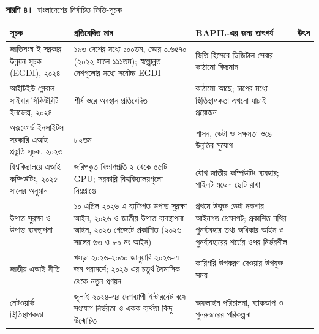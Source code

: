 \documentclass[border=10pt]{standalone}
\begin{document}
\begin{minipage}{17cm}
{\large\bfseries সারণি ৪।}\ {\large বাংলাদেশের নির্বাচিত ভিত্তি-সূচক}\par\vspace{7pt}
\small
{}
\begin{tabularx}{\linewidth}{@{}>{\hsize=1.045\hsize\raggedright\arraybackslash}X>{\hsize=1.545\hsize\raggedright\arraybackslash}X>{\hsize=1.000\hsize\raggedright\arraybackslash}X>{\hsize=0.409\hsize\raggedright\arraybackslash}X@{}}
\arrayrulecolor{bapilrule}\toprule
\rowcolor{white}\textbf{সূচক} & \textbf{প্রতিবেদিত মান} & \textbf{BAPIL-এর জন্য তাৎপর্য} & \textbf{উৎস} \\
\midrule
জাতিসংঘ ই-সরকার উন্নয়ন সূচক (EGDI), ২০২৪ & ১৯৩ দেশের মধ্যে ১০০তম, স্কোর ০.৬৫৭০ (২০২২ সালে ১১১তম); স্বল্পোন্নত দেশগুলোর মধ্যে সর্বোচ্চ EGDI & ভিত্তি হিসেবে ডিজিটাল সেবার কাঠামো বিদ্যমান & [5, 23] \\
আইটিইউ গ্লোবাল সাইবার সিকিউরিটি ইনডেক্স, ২০২৪ & শীর্ষ স্তরে অবস্থান প্রতিবেদিত & কাঠামো আছে; চাপের মধ্যে স্থিতিস্থাপকতা এখনো যাচাই প্রয়োজন & [24, 25] \\
অক্সফোর্ড ইনসাইটস সরকারি এআই প্রস্তুতি সূচক, ২০২৩ & ৮২তম & শাসন, ডেটা ও সক্ষমতা স্তম্ভে উন্নতির সুযোগ & [26, 27] \\
বিশ্ববিদ্যালয়ে এআই কম্পিউটিং, ২০২৫ সালের অনুমান & জরিপকৃত বিভাগপ্রতি ২ থেকে ৫৫টি GPU; সরকারি বিশ্ববিদ্যালয়গুলো নিম্নপ্রান্তে & যৌথ জাতীয় কম্পিউটিং ব্যবহার; পাইলট মডেল ছোট রাখা & [27] \\
উপাত্ত সুরক্ষা ও উপাত্ত ব্যবস্থাপনা & ১০ এপ্রিল ২০২৬-এ ব্যক্তিগত উপাত্ত সুরক্ষা আইন, ২০২৬ ও জাতীয় উপাত্ত ব্যবস্থাপনা আইন, ২০২৬ গেজেটে প্রকাশিত (২০২৬ সালের ৬৩ ও ৮০ নং আইন) & প্রথমে উন্মুক্ত ডেটা নকশার আইনগত প্রেক্ষাপট; প্রকাশিত নথির পুনর্ব্যবহার তথ্য অধিকার আইন ও পুনর্ব্যবহারের শর্তের ওপর নির্ভরশীল & [8, 9] \\
জাতীয় এআই নীতি & খসড়া ২০২৬-২০৩০ জানুয়ারি ২০২৬-এ জন-পরামর্শে; ২০২৬-এর চতুর্থ ত্রৈমাসিক থেকে নতুন প্রণয়ন & কারিগরি উপকরণ দেওয়ার উপযুক্ত সময় & [12, 16] \\
নেটওয়ার্ক স্থিতিস্থাপকতা & জুলাই ২০২৪-এর দেশব্যাপী ইন্টারনেট বন্ধে সংযোগ-নির্ভরতা ও একক ব্যর্থতা-বিন্দু উন্মোচিত & অফলাইন পরিচালনা, ব্যাকআপ ও পুনরুদ্ধারের পরিকল্পনা & [25] \\
\bottomrule
\end{tabularx}
\par\vspace{5pt}{\footnotesize\itshape সূচকগুলো ভিন্ন ভিন্ন বছরে ভিন্ন বিষয় পরিমাপ করে, তাই সরাসরি তুলনীয় নয়। মানগুলো উদ্ধৃত উৎসে যেমন প্রতিবেদিত তেমনই দেওয়া হয়েছে।}
\par{}
\end{minipage}
\end{document}
